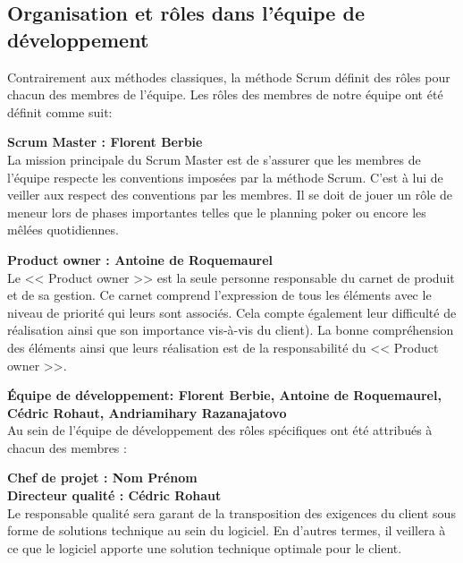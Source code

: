 \subsection{Organisation et rôles dans l'équipe de développement}

Contrairement aux méthodes classiques, la méthode Scrum définit des rôles pour chacun des membres de l'équipe. Les rôles des membres de notre équipe ont été définit comme suit: 

\textbf{Scrum Master : Florent Berbie } \\  
La mission principale du Scrum Master est de s'assurer que les membres de l'équipe respecte les conventions imposées par la méthode Scrum. C'est à lui de veiller aux respect des conventions par les membres. Il se doit de jouer un rôle de meneur lors de phases importantes telles que le planning poker ou encore les mêlées quotidiennes.
        
\textbf{Product owner : Antoine de Roquemaurel} \\
Le << Product owner >> est la seule personne responsable du carnet de produit et de sa gestion. Ce carnet comprend l'expression de tous les éléments avec le niveau de priorité qui leurs sont associés. Cela compte également leur difficulté de réalisation ainsi que son importance vis-à-vis du client). La bonne compréhension des éléments ainsi que leurs réalisation est de la responsabilité du << Product owner >>.
                    
\textbf{Équipe de développement: Florent Berbie, Antoine de Roquemaurel, Cédric Rohaut, Andriamihary Razanajatovo} \\
Au sein de l'équipe de développement des rôles spécifiques ont été attribués à chacun des membres :
                    
\textbf{Chef de projet : Nom Prénom} \\                   
                    
\textbf{Directeur qualité : Cédric Rohaut} \\
Le responsable qualité sera garant de la transposition des exigences du client sous forme de solutions technique au sein du logiciel. En d'autres termes, il veillera à ce que le logiciel apporte une solution technique optimale pour le client. 


